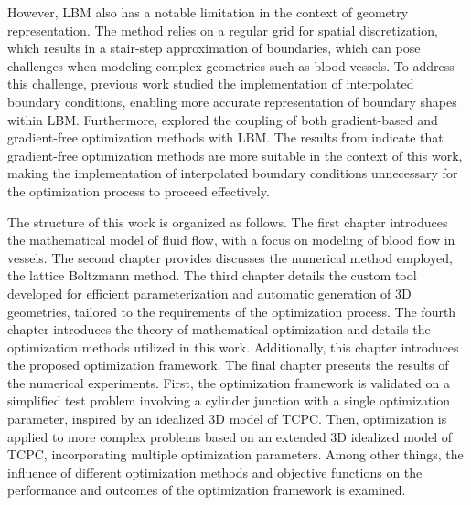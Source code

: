 However, LBM also has a notable limitation in the context of geometry representation. The method relies on a regular grid for spatial discretization, which results in a stair-step approximation of boundaries, which can pose challenges when modeling complex geometries such as blood vessels. To address this challenge, previous work \cite{buresBP, buresVU} studied the implementation of interpolated boundary conditions, enabling more accurate representation of boundary shapes within LBM. Furthermore, \cite{buresVU} explored the coupling of both gradient-based and gradient-free optimization methods with LBM. The results from \cite{buresVU} indicate that gradient-free optimization methods are more suitable in the context of this work, making the implementation of interpolated boundary conditions unnecessary for the optimization process to proceed effectively.

The structure of this work is organized as follows. The first chapter introduces the mathematical model of fluid flow, with a focus on modeling of blood flow in vessels. The second chapter provides discusses the numerical method employed, the lattice Boltzmann method. The third chapter details the custom tool developed for efficient parameterization and automatic generation of 3D geometries, tailored to the requirements of the optimization process. The fourth chapter introduces the theory of mathematical optimization and details the optimization methods utilized in this work. Additionally, this chapter introduces the proposed optimization framework. The final chapter presents the results of the numerical experiments. First, the optimization framework is validated on a simplified test problem involving a cylinder junction with a single optimization parameter, inspired by an idealized 3D model of TCPC. Then, optimization is applied to more complex problems based on an extended 3D idealized model of TCPC, incorporating multiple optimization parameters. Among other things, the influence of different optimization methods and objective functions on the performance and outcomes of the optimization framework is examined.


